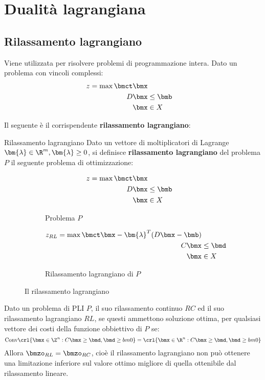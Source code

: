 \documentclass[\main/main.tex]{subfiles}
\begin{document}
\chapter{Dualità lagrangiana}
\section{Rilassamento lagrangiano}
Viene utilizzata per risolvere problemi di programmazione intera. Dato un problema con vincoli complessi:
\begin{align*}
    z = \max \bmct\bmx \\
    D\bmx &\leq \bmb \\
    \bmx &\in X
\end{align*}

Il seguente è il corrispendente \textbf{rilassamento lagrangiano}:

\begin{definition}{Rilassamento lagrangiano}
    Dato un vettore di moltiplicatori di Lagrange \(\bm{\lambda} \in \R^m, \bm{\lambda}\geq 0\), si definisce \textbf{rilassamento lagrangiano} del problema \(P\) il seguente problema di ottimizzazione:
    \begin{figure}
        \begin{subfigure}{0.49\textwidth}
            \begin{align*}
                z = \max \bmct\bmx \\
                D\bmx &\leq \bmb \\
                \bmx &\in X
            \end{align*}
            \caption{Problema \(P\)}
        \end{subfigure}
        \begin{subfigure}{0.49\textwidth}
            \begin{align*}
                z_{RL} = \max \bmct\bmx - \bm{\lambda}^T(D\bmx-\bmb) \\
                C\bmx &\leq \bmd \\
                \bmx &\in X
            \end{align*}
            \caption{Rilassamento lagrangiano di \(P\)}
        \end{subfigure}
        \caption{Il rilassamento lagrangiano}
    \end{figure}
\end{definition}

\begin{theorem}
    Dato un problema di PLI \(P\), il suo rilassamento continuo \(RC\) ed il suo rilassamento lagrangiano \(RL\), se questi ammettono soluzione ottima, per qualsiasi vettore dei costi della funzione obbiettivo di \(P\) se:
    \[
        \text{Conv}\crl{\bmx \in \Z^n: C\bmx \geq \bmd, \bmd \geq bm{0}} = \crl{\bmx \in \R^n: C\bmx \geq \bmd, \bmd \geq bm{0}}
    \]
    Allora \(\bmzo_{RL} = \bmzo_{RC}\), cioè il rilassamento lagrangiano non può ottenere una limitazione inferiore sul valore ottimo migliore di quella ottenibile dal rilassamento lineare.
\end{theorem}
\end{document}
